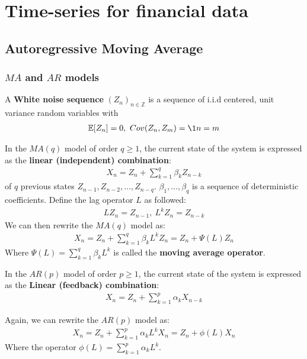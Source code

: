 \newpage
\section{Time-series for financial data}
\subsection{Autoregressive Moving Average}
\subsubsection{$MA$ and $AR$ models}
\begin{definition}
    A \textbf{White noise sequence} $(Z_n)_{n\in\mathbb{Z}}$ is a sequence of i.i.d centered, unit variance random variables with
    \begin{align*}
        \mathbb{E}[Z_n] = 0, \ Cov(Z_n, Z_m) = \1{n=m}
    \end{align*}
\end{definition}

\begin{definition}
    In the $MA(q)$ model of order $q\ge 1$, the current state of the system is expressed as the \textbf{linear (independent) combination}:
    \begin{align*}
        \boxed{
            X_n = Z_n + \sum_{k=1}^q \beta_k Z_{n-k}
        }
    \end{align*}
    \noindent of $q$ previous states $Z_{n-1}, Z_{n-2}, \dots, Z_{n-q}$. $\beta_1, \dots, \beta_q$ is a sequence of deterministic coefficients. Define the lag operator $L$ as followed:
    \begin{align*}
        LZ_n = Z_{n-1}, \ L^kZ_n = Z_{n-k}
    \end{align*}
    \noindent We can then rewrite the $MA(q)$ model as:
    \begin{align*}
        \boxed{
            X_n = Z_n + \sum_{k=1}^q\beta_kL^kZ_n = Z_n + \Psi(L)Z_n
        }   
    \end{align*}
    \noindent Where $\Psi(L) = \sum_{k=1}^q \beta_kL^k$ is called the \textbf{moving average operator}.
\end{definition}

\begin{definition}
    In the $AR(p)$ model of order $p\ge 1$, the current state of the system is expressed as the \textbf{Linear (feedback) combination}:
    \begin{align*}
        \boxed{
            X_n = Z_n + \sum_{k=1}^p \alpha_k X_{n-k}
        }
    \end{align*}

    \noindent Again, we can rewrite the $AR(p)$ model as:
    \begin{align*}
        \boxed{
            X_n = Z_n + \sum_{k=1}^p \alpha_kL^kX_n = Z_n + \phi(L)X_n
        }
    \end{align*}
    \noindent Where the operator $\phi(L) = \sum_{k=1}^p \alpha_kL^k$.
\end{definition}

